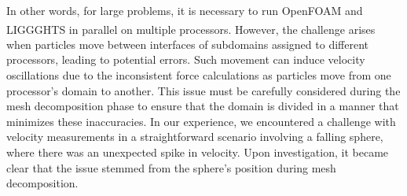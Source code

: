 In other words, for large problems, it is necessary to run OpenFOAM and LIGGGHTS\textsuperscript{\textregistered} in parallel on multiple processors. However, the challenge arises when particles move between interfaces of subdomains assigned to different processors, leading to potential errors. Such movement can induce velocity oscillations due to the inconsistent force calculations as particles move from one processor's domain to another. This issue must be carefully considered during the mesh decomposition phase to ensure that the domain is divided in a manner that minimizes these inaccuracies. In our experience, we encountered a challenge with velocity measurements in a straightforward scenario involving a falling sphere, where there was an unexpected spike in velocity. Upon investigation, it became clear that the issue stemmed from the sphere's position during mesh decomposition. 
